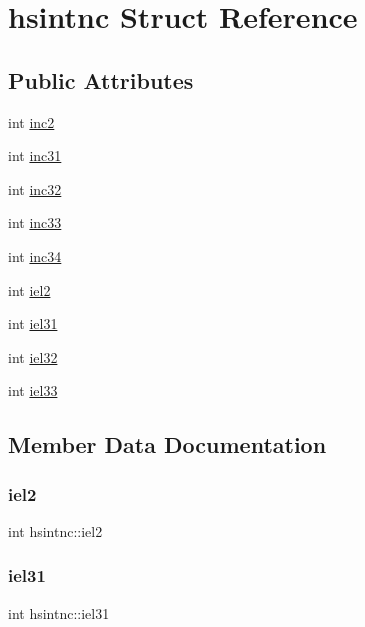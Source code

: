 \hypertarget{structhsintnc}{}\section{hsintnc Struct Reference}
\label{structhsintnc}
\subsection*{Public Attributes}
\begin{DoxyCompactItemize}
\item 
int \hyperlink{structhsintnc_addd42485573dfc6e6b5d8d82d576c4ea}{inc2}
\item 
int \hyperlink{structhsintnc_ab92e1f12a626ce64efa90304f3bfd0b2}{inc31}
\item 
int \hyperlink{structhsintnc_af49d27dd22e0d1dd562079435977c6b0}{inc32}
\item 
int \hyperlink{structhsintnc_aecf31857e55edd6bd1c9789b65a81a3d}{inc33}
\item 
int \hyperlink{structhsintnc_a015cc652162a36a9fc32ea1326f633fc}{inc34}
\item 
int \hyperlink{structhsintnc_a7495737c3bc3b44271b668312b963f24}{iel2}
\item 
int \hyperlink{structhsintnc_ac4c7cd17aae31a05fe7876ba53ca6e7c}{iel31}
\item 
int \hyperlink{structhsintnc_a7a9505e54def0720fae7c6be544ef1cd}{iel32}
\item 
int \hyperlink{structhsintnc_a6d6b38cf8e281a9caaa2d6cedf4e636d}{iel33}
\end{DoxyCompactItemize}


\subsection{Member Data Documentation}
\mbox{\label{structhsintnc_a7495737c3bc3b44271b668312b963f24}} 
\subsubsection{\texorpdfstring{iel2}{iel2}}
{\footnotesize\ttfamily int hsintnc\+::iel2}

\mbox{\label{structhsintnc_ac4c7cd17aae31a05fe7876ba53ca6e7c}} 
\subsubsection{\texorpdfstring{iel31}{iel31}}
{\footnotesize\ttfamily int hsintnc\+::iel31}

